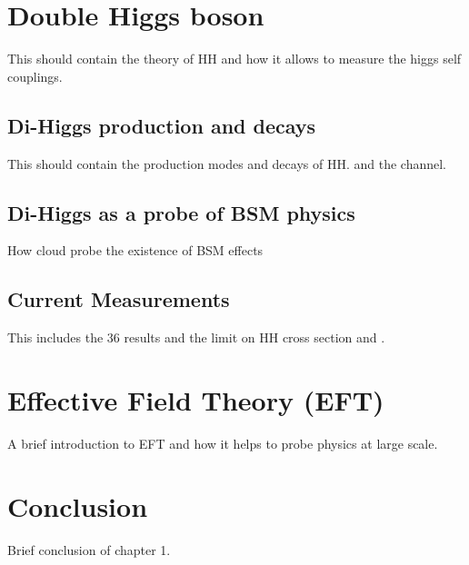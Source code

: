 \section{Double Higgs boson}
\label{chap1:HH}

This should contain the theory of HH and how it allows to measure the higgs self couplings.

\subsection{Di-Higgs production and decays}
\label{chap1:HH:HPD}

This should contain the production modes and decays of HH. and the \HHyybb channel.

\subsection{Di-Higgs as a probe of BSM physics}
\label{chap1:HH:BSM}
How \kl cloud probe the existence of BSM effects

\subsection{Current Measurements}
\label{chap1:HH:CM}
This includes the 36 \ifb results and the limit on HH cross section and \kl.

\section{Effective Field Theory (EFT)}
\label{chap1:EFT}

A brief introduction to EFT and how it helps to probe physics at large scale.\\

\section{Conclusion}
\label{chap1:Conc}

Brief conclusion of chapter 1.




